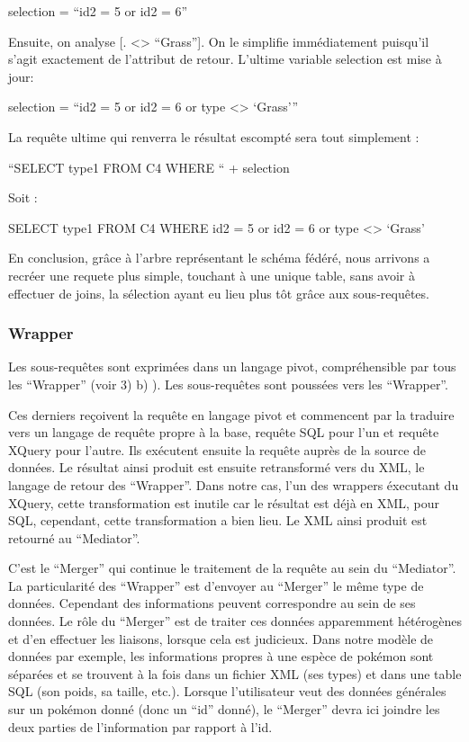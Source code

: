selection = “id2 = 5 or id2 = 6”

Ensuite, on analyse [. <> “Grass”]. On le simplifie immédiatement puisqu’il s’agit exactement de l’attribut de retour. L’ultime variable selection est mise à jour:

selection = “id2 = 5 or id2 = 6 or type <> ‘Grass’”

La requête ultime qui renverra le résultat escompté sera tout simplement :

“SELECT type1 FROM C4 WHERE “ + selection

Soit :

SELECT type1 FROM C4 WHERE id2 = 5 or id2 = 6 or type <> ‘Grass’

En conclusion, grâce à l’arbre représentant le schéma fédéré, nous arrivons a recréer une requete plus simple, touchant à une unique table,  sans avoir à effectuer de joins, la sélection ayant eu lieu plus tôt grâce aux sous-requêtes.

\subsubsection{Wrapper}

Les sous-requêtes sont exprimées dans un langage pivot, compréhensible par tous les “Wrapper” (voir 3) b) ). Les sous-requêtes sont poussées vers les “Wrapper”.

Ces derniers reçoivent la requête en langage pivot et commencent par la traduire vers un langage de requête propre à la base, requête SQL pour l’un et requête XQuery pour l’autre. Ils exécutent ensuite la requête auprès de la source de données. Le résultat ainsi produit est ensuite retransformé vers du XML, le langage de retour des “Wrapper”. Dans notre cas, l’un des wrappers éxecutant du XQuery, cette transformation est inutile car le résultat est déjà en XML, pour SQL, cependant, cette transformation a bien lieu. Le XML ainsi produit est retourné au “Mediator”.

C’est le “Merger” qui continue le traitement de la requête au sein du “Mediator”. La particularité des “Wrapper” est d’envoyer au “Merger” le même type de données. Cependant des informations peuvent correspondre au sein de ses données. Le rôle du “Merger” est de traiter ces données apparemment hétérogènes et d’en effectuer les liaisons, lorsque cela est judicieux. Dans notre modèle de données par exemple, les informations propres à une espèce de pokémon sont séparées et se trouvent à la fois dans un fichier XML (ses types) et dans une table SQL (son poids, sa taille, etc.). Lorsque l’utilisateur veut des données générales sur un pokémon donné (donc un “id” donné), le “Merger” devra ici joindre les deux parties de l’information par rapport à l’id. 

